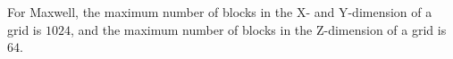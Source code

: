 \begin{enumerate}
\begin{itemize}
For Maxwell, the maximum number of blocks in the X- and Y-dimension of a grid is $1024$, and the maximum number of blocks in the Z-dimension of a grid is $64$.

\end{itemize}

%
%
%
%
%
%
%
%
%
%

\end{enumerate}
